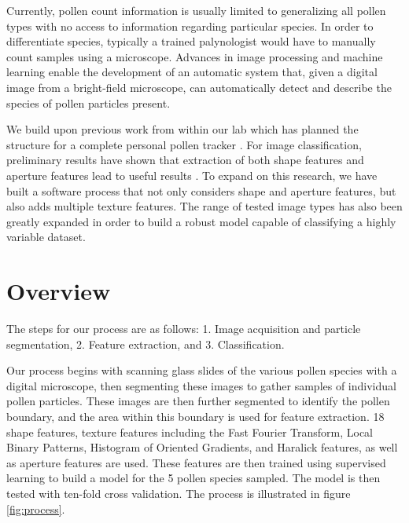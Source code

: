 \documentclass[runningheads,a4paper]{llncs}
\begin{document}
Currently, pollen count information is usually limited to generalizing all pollen types with no access to information regarding particular species. In order to differentiate species, typically a trained palynologist would have to manually count samples using a microscope. Advances in image processing and machine learning enable the development of an automatic system that, given a digital image from a bright-field microscope, can automatically detect and describe the species of pollen particles present.

We build upon previous work from within our lab which has planned the structure for a complete personal pollen tracker \cite{Lozano_2012}. For image classification, preliminary results have shown that extraction of both shape features and aperture features lead to useful results \cite{Lozano_2014}. To expand on this research, we have built a software process that not only considers shape and aperture features, but also adds multiple texture features. The range of tested image types has also been greatly expanded in order to build a robust model capable of classifying a highly variable dataset. 

  
  
  
  

\section{Overview} 

The steps for our process are as follows: 1. Image acquisition and particle segmentation, 2. Feature extraction, and 3. Classification.

Our process begins with scanning glass slides of the various pollen species with a digital microscope, then segmenting these images to gather samples of individual pollen particles. These images are then further segmented to identify the pollen boundary, and the area within this boundary is used for feature extraction. 18 shape features, texture features including the Fast Fourier Transform, Local Binary Patterns, Histogram of Oriented Gradients, and Haralick features, as well as aperture features are used. These features are then trained using supervised learning to build a model for the 5 pollen species sampled. The model is then tested with ten-fold cross validation. The process is illustrated in figure \ref{fig:process}. 
    
    
    
    
    
    
    
\end{document}
